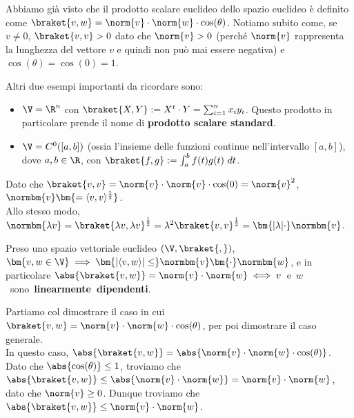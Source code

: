 \documentclass[11pt, a4paper, titlepage, oneside]{scrbook}
\begin{document}
Abbiamo già visto che il prodotto scalare euclideo dello spazio euclideo è definito come \mbox{$\braket{v,w} = \norm{v} \cdot \norm{w} \cdot \cos(\theta)$}. Notiamo subito come, se $v \neq 0$, $\braket{v,v} > 0$ dato che $\norm{v} > 0$ (perché $\norm{v}$ rappresenta la lunghezza del vettore $v$ e quindi non può mai essere negativa) e $\cos(\theta) = \cos(0) = 1$.

Altri due esempi importanti da ricordare sono:
\begin{itemize}
    \item $\V = \R^n$ con $\braket{X,Y} := X^t \cdot Y = \sum_{i = 1}^n x_i y_i$. Questo prodotto in particolare prende il nome di \textbf{prodotto scalare standard}.
    \item $\V = C^0([a,b])$ (ossia l'insieme delle funzioni continue nell'intervallo $[a,b]$), dove $a,b \in \R$, con \mbox{$\braket{f,g} := \int_a^b f(t) g(t) \ dt$}.
\end{itemize}

\begin{Proposizione}[Corollario]
\label{corollario-norma-v}
Dato che $\braket{v,v} = \norm{v} \cdot \norm{v} \cdot \cos(0) = \norm{v}^2$, $\normbm{v} \bm{= \langle v,v \rangle^{\frac{1}{2}}}$.  \\
Allo stesso modo, $\normbm{\lambda v} = \braket{\lambda v, \lambda v}^{\frac{1}{2}} = \lambda^2 \braket{v,v}^{\frac{1}{2}} = \bm{\lvert \lambda \rvert \cdot} \normbm{v}$.
\end{Proposizione}

\begin{Proposizione}
\label{propos-disuguaglianza-cauchy-schwarz}
Preso uno spazio vettoriale euclideo $(\V, \braket{,})$, $\bm{v,w \in \V} \implies \bm{\lvert \langle v,w \rangle \rvert \leq} \normbm{v} \bm{\cdot} \normbm{w}$, e in particolare \mbox{$\abs{\braket{v,w}} = \norm{v} \cdot \norm{w} \iff v$ e $w$ sono \textbf{linearmente dipendenti}}.
\end{Proposizione}

\Dimostrazione \nopagebreak

Partiamo col dimostrare il caso in cui $\braket{v,w} = \norm{v} \cdot \norm{w} \cdot \cos(\theta)$, per poi dimostrare il caso generale. \\
In questo caso, $\abs{\braket{v,w}} = \abs{\norm{v} \cdot \norm{w} \cdot \cos(\theta)}$. Dato che $\abs{\cos(\theta)} \leq 1$, troviamo che \mbox{$\abs{\braket{v,w}} \leq \abs{\norm{v} \cdot \norm{w}} = \norm{v} \cdot \norm{w}$}, dato che $\norm{v} \geq 0$. Dunque troviamo che $\abs{\braket{v,w}} \leq \norm{v} \cdot \norm{w}$.
\end{document}
